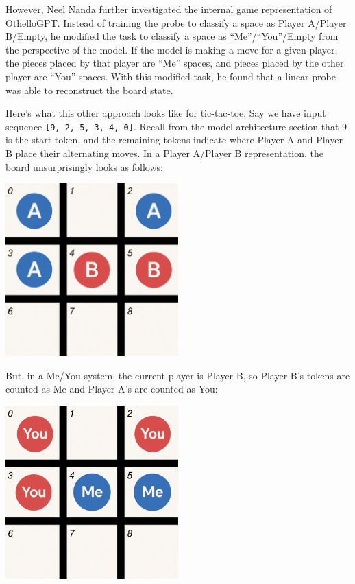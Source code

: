 \documentclass[11pt]{article}
\begin{document}
However,
\href{https://www.neelnanda.io/mechanistic-interpretability/othello}{Neel
Nanda} further investigated the internal game representation of
OthelloGPT. Instead of training the probe to classify a space as Player
A/Player B/Empty, he modified the task to classify a space as
``Me''/``You''/Empty from the perspective of the model. If the model is
making a move for a given player, the pieces placed by that player are
``Me'' spaces, and pieces placed by the other player are ``You'' spaces.
With this modified task, he found that a linear probe was able to
reconstruct the board state.

Here's what this other approach looks like for tic-tac-toe: Say we have
input sequence \texttt{{[}9,\ 2,\ 5,\ 3,\ 4,\ 0{]}}. Recall from the
model architecture section that 9 is the start token, and the remaining
tokens indicate where Player A and Player B place their alternating
moves. In a Player A/Player B representation, the board unsurprisingly
looks as follows:

\begin{center}
\includegraphics[width=0.5\textwidth,keepaspectratio]{inserted_images/p1_p2_board_edit.png}
\end{center}

But, in a Me/You system, the current player is Player B, so Player B's
tokens are counted as Me and Player A's are counted as You:

\begin{center}
\includegraphics[width=0.5\textwidth,keepaspectratio]{inserted_images/me_opp_board.png}
\end{center}
\end{document}
